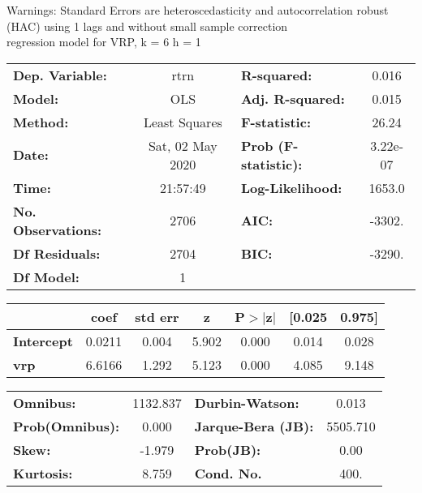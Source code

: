 Warnings: \newline
 [1] Standard Errors are heteroscedasticity and autocorrelation robust (HAC) using 1 lags and without small sample correction\\ 

regression model for VRP, k = 6 h = 1\begin{center}
\begin{tabular}{lclc}
\toprule
\textbf{Dep. Variable:}    &       rtrn       & \textbf{  R-squared:         } &     0.016   \\
\textbf{Model:}            &       OLS        & \textbf{  Adj. R-squared:    } &     0.015   \\
\textbf{Method:}           &  Least Squares   & \textbf{  F-statistic:       } &     26.24   \\
\textbf{Date:}             & Sat, 02 May 2020 & \textbf{  Prob (F-statistic):} &  3.22e-07   \\
\textbf{Time:}             &     21:57:49     & \textbf{  Log-Likelihood:    } &    1653.0   \\
\textbf{No. Observations:} &        2706      & \textbf{  AIC:               } &    -3302.   \\
\textbf{Df Residuals:}     &        2704      & \textbf{  BIC:               } &    -3290.   \\
\textbf{Df Model:}         &           1      & \textbf{                     } &             \\
\bottomrule
\end{tabular}
\begin{tabular}{lcccccc}
                   & \textbf{coef} & \textbf{std err} & \textbf{z} & \textbf{P$> |$z$|$} & \textbf{[0.025} & \textbf{0.975]}  \\
\midrule
\textbf{Intercept} &       0.0211  &        0.004     &     5.902  &         0.000        &        0.014    &        0.028     \\
\textbf{vrp}       &       6.6166  &        1.292     &     5.123  &         0.000        &        4.085    &        9.148     \\
\bottomrule
\end{tabular}
\begin{tabular}{lclc}
\textbf{Omnibus:}       & 1132.837 & \textbf{  Durbin-Watson:     } &    0.013  \\
\textbf{Prob(Omnibus):} &   0.000  & \textbf{  Jarque-Bera (JB):  } & 5505.710  \\
\textbf{Skew:}          &  -1.979  & \textbf{  Prob(JB):          } &     0.00  \\
\textbf{Kurtosis:}      &   8.759  & \textbf{  Cond. No.          } &     400.  \\
\bottomrule
\end{tabular}
\end{center}

